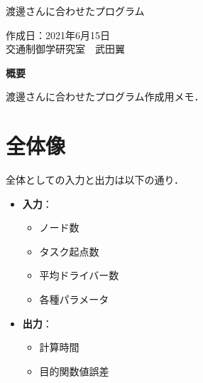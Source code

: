 \documentclass[a4paper,dvipdfmx]{ujarticle}
\begin{document}
\vspace{1zh}
\begin{center}
\LARGE{

    渡邊さんに合わせたプログラム

}
\end{center}
\vspace{1zh}
\begin{flushright}

    作成日：2021年6月15日\\
    交通制御学研究室　武田翼

\end{flushright}
\vspace{1zh}



{\normalsize %
\begin{center}%
\begin{minipage}{.8\textwidth}%
\vspace{1.0em} %
%
\begin{center}
\textbf{概要}
\end{center}


    渡邊さんに合わせたプログラム作成用メモ．


\end{minipage}%
\end{center}%
}%


\section{全体像}


    全体としての入力と出力は以下の通り．
    \begin{itemize}
        \item \textbf{入力}：
            \begin{itemize}
                \item ノード数
                \item タスク起点数
                \item 平均ドライバー数
                \item 各種パラメータ
            \end{itemize}

        \item \textbf{出力}：
            \begin{itemize}
                \item 計算時間
                \item 目的関数値誤差
            \end{itemize}
    \end{itemize}
\end{document}
